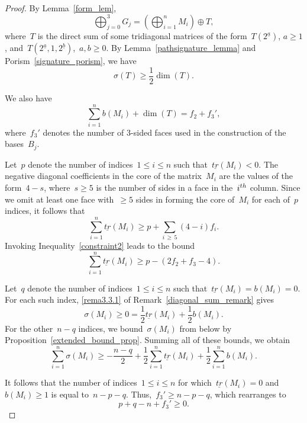 \documentclass[10pt,a4paper]{amsart}
\numberwithin{equation}{section}
\begin{document}
\begin{proof}
By Lemma~\ref{form_lem},
\begin{equation}\label{e: g sum}
\bigoplus_{j=0}^3 G_j = \left(\bigoplus_{i=1}^n M_i \right) \oplus T,
\end{equation}
where~$T$ is the direct sum of some tridiagonal matrices of the form~$T(2^{\underline a})$, $a \ge 1$, and~$T(2^{\underline a}, 1, 2^{\underline b})$,~$a,b \ge 0$. By Lemma~\ref{pathsignature_lemma} and Porism~\ref{signature_porism}, we have
\begin{equation}\label{e: T bound}
\sigma(T) \ge \frac12 \dim(T).
\end{equation}

We also have
\begin{equation}\label{e: k bound}
\sum_{i=1}^n b(M_i) + \dim(T) = f_2 + f_3',
\end{equation}
where~$f_3'$ denotes the number of 3-sided faces used in the construction of the bases~$B_j$.


Let~$p$ denote the number of indices~$1 \le i \le n$ such that~$\underline{tr}(M_i) < 0$. The negative diagonal coefficients in the core of the matrix~$M_i$ are the values of the form~$4-s$, where~$s \ge 5$ is the number of sides in a face in the~$i^{\rm th}$ column. Since we omit at least one face with~$\ge 5$ sides in forming the core of~$M_i$ for each of~$p$ indices, it follows that
\[
\sum_{i=1}^n \underline{tr}(M_i) \ge p+ \sum_{i\,\ge\,5} (4-i)f_i.
\]
Invoking Inequality~\eqref{constraint2} leads to the bound
\begin{equation}\label{e: d bound}
\sum_{i=1}^n \underline{tr}(M_i) \ge p - (2f_2 + f_3 - 4).
\end{equation}


Let~$q$ denote the number of indices~$1 \le i \le n$ such that~$\underline{tr}(M_i) = b(M_i) = 0$. For each such index, \eqref{rema3.3.1} of Remark~\ref{diagonal_sum_remark} gives
\[
\sigma(M_i) \ge 0 = \frac12 \underline{tr}(M_i) + \frac12 b(M_i).
\]
For the other~$n-q$ indices, we bound~$\sigma(M_i)$ from below by Proposition~\ref{extended_bound_prop}. Summing all of these bounds, we obtain
\begin{equation}\label{e: sigma bound}
\sum_{i=1}^n \sigma(M_i) \ge -\frac{n-q}{2} + \frac12 \sum_{i=1}^n \underline{tr}(M_i) + \frac12 \sum_{i=1}^n b(M_i).
\end{equation}

It follows that the number of indices~$1 \le i \le n$ for which~$\underline{tr}(M_i) = 0$ and~$b(M_i) \ge 1$ is equal to~$n-p-q$. Thus,~$f_3' \ge n-p-q$, which rearranges to
\begin{equation}\label{e: f3' bound}
p+q -n + f_3' \ge 0.
\end{equation}


\end{proof}
\end{document}
